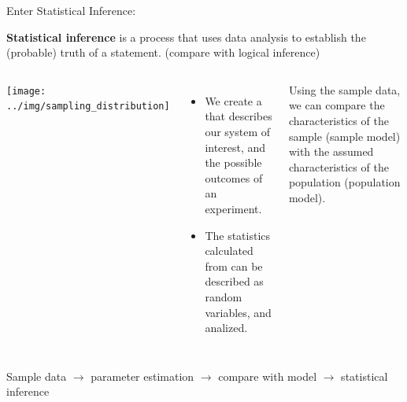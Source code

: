 \begin{frame}{Enter Statistical Inference:}
  \begin{block}{}
    {\bf Statistical inference} is a process that uses data analysis to establish the (probable) truth of a statement. (compare with logical inference)
  \end{block}\bigskip
  \begin{columns}[T]
      \texttt{[image: ../img/sampling\_distribution]}
      \begin{itemize}
        \item We create a  that describes our system of interest, and the possible outcomes of an experiment.
        \item The statistics calculated from  can be described as random variables, and analized.
      \end{itemize}\bigskip

      Using the sample data, we can compare the characteristics of the sample (sample model) with the assumed characteristics of the population (population model).
  \end{columns}\bigskip

  \begin{center}
  Sample data $\rightarrow$ parameter estimation $\rightarrow$ compare with model $\rightarrow$ statistical inference
  \end{center}
\end{frame}

